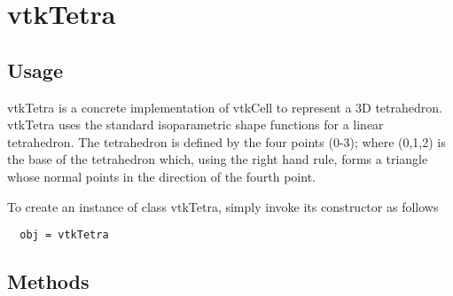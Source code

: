 \section{vtkTetra}

\subsection{Usage}

 vtkTetra is a concrete implementation of vtkCell to represent a 3D
 tetrahedron. vtkTetra uses the standard isoparametric shape functions
 for a linear tetrahedron. The tetrahedron is defined by the four points
 (0-3); where (0,1,2) is the base of the tetrahedron which, using the
 right hand rule, forms a triangle whose normal points in the direction
 of the fourth point.

To create an instance of class vtkTetra, simply
invoke its constructor as follows
\begin{verbatim}
  obj = vtkTetra
\end{verbatim}
\subsection{Methods}

